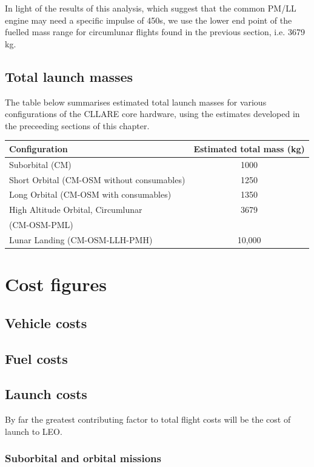 \documentclass{report}
\begin{document}
In light of the results of this analysis, which suggest that the common PM/LL engine may need a specific impulse of 450s, we use the lower end point of the fuelled mass range for circumlunar flights found in the previous section, i.e. 3679 kg.
\subsection{Total launch masses}

The table below summarises estimated total launch masses for various configurations of the CLLARE core hardware, using the estimates developed in the preceeding sections of this chapter.

\begin{tabular}{ | l | c | }
\hline
Configuration & Estimated total mass (kg) \\
\hline
\hline
Suborbital (CM) & 1000 \\
\hline
Short Orbital (CM-OSM without consumables) & 1250 \\
\hline
Long Orbital (CM-OSM with consumables) & 1350 \\
\hline
High Altitude Orbital, Circumlunar & 3679 \\
(CM-OSM-PML) & \\
\hline
Lunar Landing (CM-OSM-LLH-PMH) & 10,000 \\
\hline
\end{tabular}

\section{Cost figures}

\subsection{Vehicle costs}

\subsection{Fuel costs}

\subsection{Launch costs}

By far the greatest contributing factor to total flight costs will be the cost of launch to LEO. 

\subsubsection{Suborbital and orbital missions}
\end{document}
